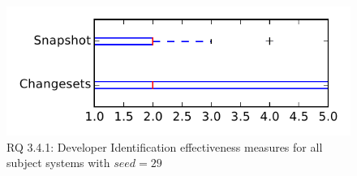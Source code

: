 
\begin{figure}
\centering
\includegraphics[height=0.4\textheight]{figures/dit_seed/rq1_tiny_29}
\caption{RQ 3.4.1: Developer Identification effectiveness measures for all subject systems with $seed=29$}
\label{fig:dit_seed:rq1:tiny}
\end{figure}
